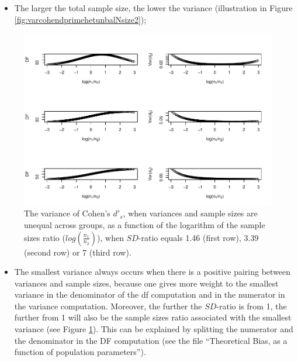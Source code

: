 \documentclass[
  man]{apa6}
\providecommand{\tightlist}{%
  \setlength{\itemsep}{0pt}\setlength{\parskip}{0pt}}
\begin{document}
\begin{itemize}
\tightlist
\item
  The larger the total sample size, the lower the variance (illustration in Figure \ref{fig:varcohendprimehetunbalNsize2});
\end{itemize}

\begin{figure}
\centering
\includegraphics{Theoretical-Variance-of-all-estimators-as-a-function-of-population-parameters_files/figure-latex/varcohendprimehetunbalnratiosdratio2-1.pdf}
\caption{\label{fig:varcohendprimehetunbalnratiosdratio2}The variance of Cohen's \(d'_s\), when variances and sample sizes are unequal across groups, as a function of the logarithm of the sample sizes ratio (\(log \left( \frac{n_1}{n_2} \right)\)), when \(SD\)-ratio equals 1.46 (first row), 3.39 (second row) or 7 (third row).}
\end{figure}

\begin{itemize}
\tightlist
\item
  The smallest variance always occurs when there is a positive pairing between variances and sample sizes, because one gives more weight to the smallest variance in the denominator of the df computation and in the numerator in the variance computation. Moreover, the further the \(SD\)-ratio is from 1, the further from 1 will also be the sample sizes ratio associated with the smallest variance (see Figure \ref{fig:varcohendprimehetunbalnratiosdratio2}). This can be explained by splitting the numerator and the denominator in the DF computation (see the file \enquote{Theoretical Bias, as a function of population parameters}).
\end{itemize}
\end{document}
